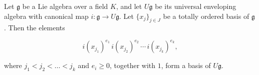 Let $\mathfrak{g}$ be a Lie algebra over a field $K$, and let $U\mathfrak{g}$ be its universal enveloping algebra with canonical map $i: \mathfrak{g} \to U\mathfrak{g}$. Let $\{x_j\}_{j \in J}$ be a totally ordered basis of $\mathfrak{g}$. Then the elements

$$i(x_{j_1})^{e_1} \, i(x_{j_2})^{e_2} \, \cdots \, i(x_{j_k})^{e_k},$$

where $j_1 < j_2 < \dots < j_k$ and $e_i \geq 0$, together with $1$, form a basis of $U\mathfrak{g}$.
